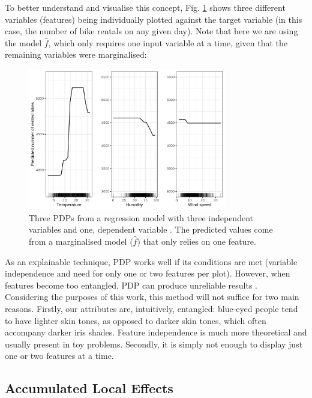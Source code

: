 To better understand and visualise this concept, Fig. \ref{fig:partial_dependence_plot} shows three different variables (features) being individually plotted against the target variable (in this case, the number of bike rentals on any given day). Note that here we are using the model $\hat{f}$, which only requires one input variable at a time, given that the remaining variables were marginalised:

\begin{figure}[h]
\centering
\includegraphics[width=245pt]{figures/figure_16.pdf}
\caption{Three \ac{PDP}s from a regression model with three independent variables and one, dependent variable \cite{molnar2019}. The predicted values come from a marginalised model ($\hat{f}$) that only relies on one feature.}
\label{fig:partial_dependence_plot}
\end{figure}

As an explainable technique, \ac{PDP} works well if its conditions are met (variable independence and need for only one or two features per plot).
However, when features become too entangled, \ac{PDP} can produce unreliable results \cite{molnar2019}.\\

Considering the purposes of this work, this method will not suffice for two main reasons. Firstly, our attributes are, intuitively, entangled: blue-eyed people tend to have lighter skin tones, as opposed to darker skin tones, which often accompany darker iris shades. Feature independence is much more theoretical and usually present in toy problems.  Secondly, it is simply not enough to display just one or two features at a time.

\subsection{Accumulated Local Effects}
\label{subsec:chap2_accumulated_local_effects}

